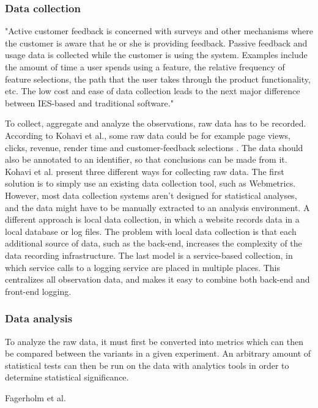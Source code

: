 \documentclass[english]{tktltiki2}
\theoremstyle{definition}
\theoremstyle{remark}
\begin{document}
\subsubsection{Data collection}
"Active customer feedback is concerned with surveys and other mechanisms where the customer is aware that he or she is providing feedback. Passive feedback and usage data is collected while the customer is using the system. Examples include the amount of time a user spends using a feature, the relative frequency of feature selections, the path that the user takes through the product functionality, etc. The low cost and ease of data collection leads to the next major difference between IES-based and traditional software." \cite{bosch2012building}

To collect, aggregate and analyze the observations, raw data has to be recorded. According to Kohavi et al., some raw data could be for example page views, clicks, revenue, render time and customer-feedback selections \cite{kohavi2007practical}. The data should also be annotated to an identifier, so that conclusions can be made from it. Kohavi et al. present three different ways for collecting raw data. The first solution is to simply use an existing data collection tool, such as Webmetrics. However, most data collection systems aren't designed for statistical analyses, and the data might have to be manually extracted to an analysis environment. A different approach is local data collection, in which a website records data in a local database or log files. The problem with local data collection is that each additional source of data, such as the back-end, increases the complexity of the data recording infrastructure. The last model is a service-based collection, in which service calls to a logging service are placed in multiple places. This centralizes all observation data, and makes it easy to combine both back-end and front-end logging.  

\subsubsection{Data analysis}
To analyze the raw data, it must first be converted into metrics which can then be compared between the variants in a given experiment. An arbitrary amount of statistical tests can then be run on the data with analytics tools in order to determine statistical significance. 

Fagerholm et al. 
\end{document}
